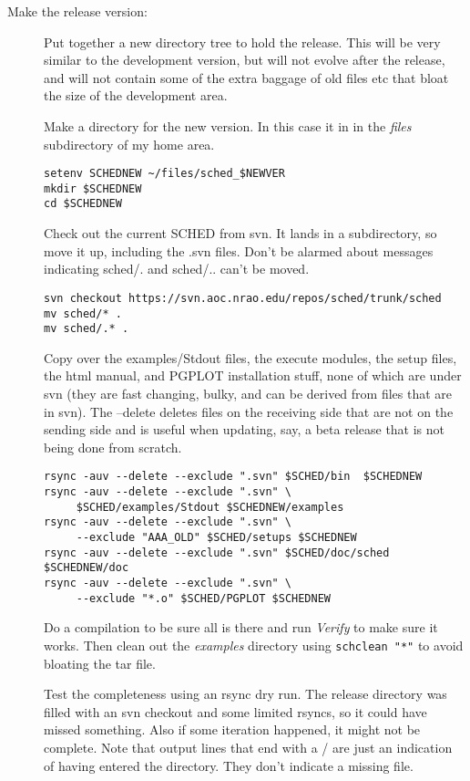 \documentclass{report}
\begin{document}
\begin{description}
\item [Make the release version:]

Put together a new directory tree to hold the release.  This will be
very similar to the development version, but will not evolve after the
release, and will not contain some of the extra baggage of old files
etc that bloat the size of the development area.

Make a directory for the new version.  In this case it in in the 
{\sl files} subdirectory of my home area.

\begin{verbatim}
setenv SCHEDNEW ~/files/sched_$NEWVER
mkdir $SCHEDNEW
cd $SCHEDNEW
\end{verbatim}

Check out the current SCHED from svn.  It lands in a subdirectory, so
move it up, including the .svn files.  Don't be alarmed about messages
indicating sched/. and sched/.. can't be moved.

\begin{verbatim}
svn checkout https://svn.aoc.nrao.edu/repos/sched/trunk/sched
mv sched/* .
mv sched/.* .
\end{verbatim}

Copy over the examples/Stdout files, the execute modules, the setup
files, the html manual, and PGPLOT installation stuff, none of which
are under svn (they are fast changing, bulky, and can be derived from
files that are in svn).  The --delete deletes files on the receiving
side that are not on the sending side and is useful when updating,
say, a beta release that is not being done from scratch.

\begin{verbatim}
rsync -auv --delete --exclude ".svn" $SCHED/bin  $SCHEDNEW
rsync -auv --delete --exclude ".svn" \
     $SCHED/examples/Stdout $SCHEDNEW/examples
rsync -auv --delete --exclude ".svn" \
     --exclude "AAA_OLD" $SCHED/setups $SCHEDNEW
rsync -auv --delete --exclude ".svn" $SCHED/doc/sched $SCHEDNEW/doc
rsync -auv --delete --exclude ".svn" \
     --exclude "*.o" $SCHED/PGPLOT $SCHEDNEW
\end{verbatim}

Do a compilation to be sure all is there and run {\sl Verify} to make
sure it works.  Then clean out the {\sl examples} directory using
{\tt schclean "*"} to avoid bloating the tar file.

Test the completeness using an rsync dry run.  The release directory
was filled with an svn checkout and some limited rsyncs, so it could
have missed something.  Also if some iteration happened, it might not
be complete. Note that output lines that end with a / are just an
indication of having entered the directory.  They don't indicate a
missing file.


\end{description}
\end{document}
